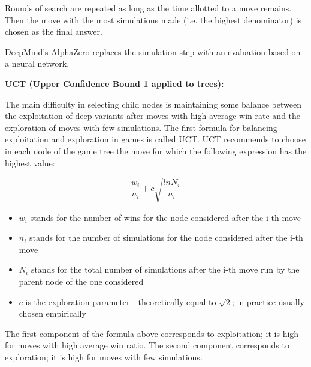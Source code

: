 \documentclass{article}
\begin{document}
\bigskip

\noindent Rounds of search are repeated as long as the time allotted to a move remains. Then the move with the most simulations made (i.e. the highest denominator) is chosen as the final answer.

\bigskip

\noindent DeepMind's AlphaZero replaces the simulation step with an evaluation based on a neural network.

\bigskip

\noindent \textbf{UCT (Upper Confidence Bound 1 applied to trees):}

\bigskip

\noindent The main difficulty in selecting child nodes is maintaining some balance between the exploitation of deep variants after moves with high average win rate and the exploration of moves with few simulations. The first formula for balancing exploitation and exploration in games is called UCT. UCT recommends to choose in each node of the game tree the move for which the following expression has the highest value:

\[\frac{w_{i}}{n_{i}} + c \sqrt{\frac{ln N_{i}}{n_i}}\]

\begin{itemize}
    \item \(w_{i}\) stands for the number of wins for the node considered after the i-th move
    \item \(n_{i}\) stands for the number of simulations for the node considered after the i-th move
    \item \(N_{i}\) stands for the total number of simulations after the i-th move run by the parent node of the one considered
    \item \(c\) is the exploration parameter—theoretically equal to \(\sqrt{2}\); in practice usually chosen empirically
\end{itemize}

\noindent The first component of the formula above corresponds to exploitation; it is high for moves with high average win ratio. The second component corresponds to exploration; it is high for moves with few simulations.

\printindex
\end{document}
